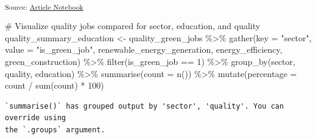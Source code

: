 \documentclass[
  letterpaper,
  DIV=11,
  numbers=noendperiod]{scrartcl}
\newenvironment{Shaded}{\begin{snugshade}}{\end{snugshade}}
\newcommand{\AttributeTok}[1]{\textcolor[rgb]{0.40,0.45,0.13}{#1}}
\newcommand{\CommentTok}[1]{\textcolor[rgb]{0.37,0.37,0.37}{#1}}
\newcommand{\DecValTok}[1]{\textcolor[rgb]{0.68,0.00,0.00}{#1}}
\newcommand{\FunctionTok}[1]{\textcolor[rgb]{0.28,0.35,0.67}{#1}}
\newcommand{\NormalTok}[1]{\textcolor[rgb]{0.00,0.23,0.31}{#1}}
\newcommand{\OtherTok}[1]{\textcolor[rgb]{0.00,0.23,0.31}{#1}}
\newcommand{\SpecialCharTok}[1]{\textcolor[rgb]{0.37,0.37,0.37}{#1}}
\newcommand{\StringTok}[1]{\textcolor[rgb]{0.13,0.47,0.30}{#1}}
\begin{document}
\textsubscript{Source:
\href{https://beeckcenter.github.io/climate-equity-workforce/index-preview.html}{Article
Notebook}}

\begin{Shaded}
\begin{Highlighting}[]
\CommentTok{\# Visualize quality jobs compared for sector, education, and quality}
\NormalTok{quality\_summary\_education }\OtherTok{\textless{}{-}}\NormalTok{ quality\_green\_jobs }\SpecialCharTok{\%\textgreater{}\%}
  \FunctionTok{gather}\NormalTok{(}\AttributeTok{key =} \StringTok{"sector"}\NormalTok{, }\AttributeTok{value =} \StringTok{"is\_green\_job"}\NormalTok{, renewable\_energy\_generation, energy\_efficiency, green\_construction) }\SpecialCharTok{\%\textgreater{}\%}
  \FunctionTok{filter}\NormalTok{(is\_green\_job }\SpecialCharTok{==} \DecValTok{1}\NormalTok{) }\SpecialCharTok{\%\textgreater{}\%}
  \FunctionTok{group\_by}\NormalTok{(sector, quality, education) }\SpecialCharTok{\%\textgreater{}\%}
  \FunctionTok{summarise}\NormalTok{(}\AttributeTok{count =} \FunctionTok{n}\NormalTok{()) }\SpecialCharTok{\%\textgreater{}\%}
  \FunctionTok{mutate}\NormalTok{(}\AttributeTok{percentage =}\NormalTok{ count }\SpecialCharTok{/} \FunctionTok{sum}\NormalTok{(count) }\SpecialCharTok{*} \DecValTok{100}\NormalTok{)}
\end{Highlighting}
\end{Shaded}

\begin{verbatim}
`summarise()` has grouped output by 'sector', 'quality'. You can override using
the `.groups` argument.
\end{verbatim}
\end{document}
